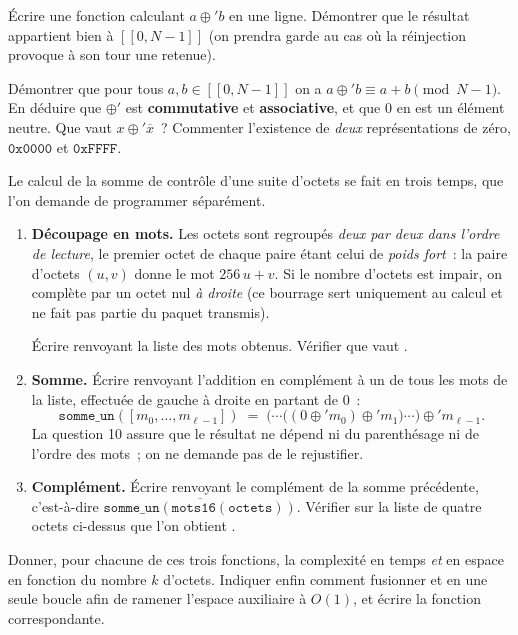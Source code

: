 \documentclass[11pt,a4paper]{article}
\begin{document}
\Q Écrire une fonction  calculant $a\oplus' b$ en une ligne. Démontrer que
le résultat appartient bien à $[\![0,N-1]\!]$ (on prendra garde au cas où la réinjection
provoque à son tour une retenue).

\Q Démontrer que pour tous $a,b\in[\![0,N-1]\!]$ on a $a\oplus' b\equiv a+b \pmod{N-1}$.
En déduire que $\oplus'$ est \textbf{commutative} et \textbf{associative}, et que $0$ en est
un élément neutre. Que vaut $x\oplus'\overline{x}$~? Commenter l'existence de \emph{deux}
représentations de zéro, $\texttt{0x0000}$ et $\texttt{0xFFFF}$.

\Q Le calcul de la somme de contrôle d'une suite d'octets se fait en trois temps, que l'on
demande de programmer séparément.

\begin{enumerate}[label=(\alph*),leftmargin=2em,itemsep=4pt]
\item \textbf{Découpage en mots.} Les octets sont regroupés \emph{deux par deux dans l'ordre
de lecture}, le premier octet de chaque paire étant celui de \emph{poids fort}~: la paire
d'octets $(u,v)$ donne le mot $256\,u+v$. Si le nombre d'octets est impair, on complète par
un octet nul \emph{à droite} (ce bourrage sert uniquement au calcul et ne fait pas partie du
paquet transmis).

Écrire  renvoyant la liste des mots obtenus. Vérifier que
 vaut \code{[0x4500, 0x0073]}.

\item \textbf{Somme.} Écrire  renvoyant l'addition en complément à un de
tous les mots de la liste, effectuée de gauche à droite en partant de $0$~:
\[ \texttt{somme\_un}([m_0,\dots,m_{\ell-1}]) \;=\;
   \big(\cdots\big((0\oplus' m_0)\oplus' m_1\big)\cdots\big)\oplus' m_{\ell-1}. \]
La question 10 assure que le résultat ne dépend ni du parenthésage ni de l'ordre des mots~;
on ne demande pas de le rejustifier.

\item \textbf{Complément.} Écrire  renvoyant le complément de la somme
précédente, c'est-à-dire
$\overline{\texttt{somme\_un}(\texttt{mots16}(\texttt{octets}))}$. Vérifier sur la liste de
quatre octets ci-dessus que l'on obtient .
\end{enumerate}

Donner, pour chacune de ces trois fonctions, la complexité en temps \emph{et} en espace en
fonction du nombre $k$ d'octets. Indiquer enfin comment fusionner  et
 en une seule boucle afin de ramener l'espace auxiliaire à $O(1)$, et écrire
la fonction correspondante.
\end{document}
